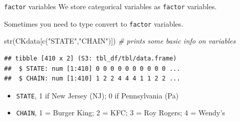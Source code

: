 \documentclass[
  ignorenonframetext,
]{beamer}
\newenvironment{Shaded}{\begin{snugshade}}{\end{snugshade}}
\newcommand{\CommentTok}[1]{\textcolor[rgb]{0.56,0.35,0.01}{\textit{#1}}}
\newcommand{\FunctionTok}[1]{\textcolor[rgb]{0.00,0.00,0.00}{#1}}
\newcommand{\NormalTok}[1]{#1}
\newcommand{\StringTok}[1]{\textcolor[rgb]{0.31,0.60,0.02}{#1}}
\providecommand{\tightlist}{%
  \setlength{\itemsep}{0pt}\setlength{\parskip}{0pt}}
\begin{document}
\begin{frame}[fragile]{\texttt{factor} variables}
\protect\hypertarget{variables}{}
We store categorical variables as \texttt{factor} variables.

Sometimes you need to type convert to \texttt{factor} variables.

\begin{Shaded}
\begin{Highlighting}[]
\FunctionTok{str}\NormalTok{(CKdata[}\FunctionTok{c}\NormalTok{(}\StringTok{"STATE"}\NormalTok{,}\StringTok{"CHAIN"}\NormalTok{)])  }\CommentTok{\# prints some basic info on variables}
\end{Highlighting}
\end{Shaded}

\begin{verbatim}
## tibble [410 x 2] (S3: tbl_df/tbl/data.frame)
##  $ STATE: num [1:410] 0 0 0 0 0 0 0 0 0 0 ...
##  $ CHAIN: num [1:410] 1 2 2 4 4 4 1 1 2 2 ...
\end{verbatim}

\begin{itemize}
\tightlist
\item
  \texttt{STATE}, 1 if New Jersey (NJ); 0 if Pennsylvania (Pa)
\item
  \texttt{CHAIN}, 1 = Burger King; 2 = KFC; 3 = Roy Rogers; 4 = Wendy's
\end{itemize}
\end{frame}
\end{document}
